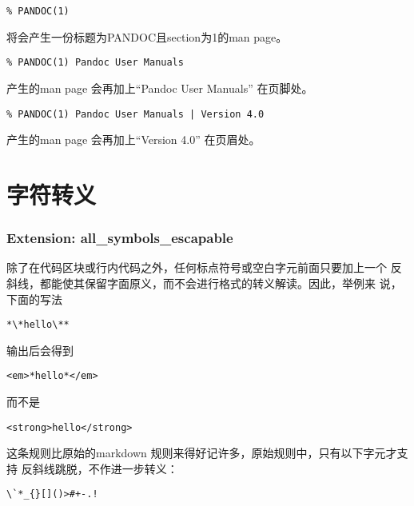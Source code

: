 \documentclass[cn]{elegantbook}
\begin{document}
\begin{lstlisting}
% PANDOC(1)
\end{lstlisting}

将会产生一份标题为PANDOC且section为1的man page。

\begin{lstlisting}
% PANDOC(1) Pandoc User Manuals
\end{lstlisting}

产生的man page 会再加上``Pandoc User Manuals'' 在页脚处。

\begin{lstlisting}
% PANDOC(1) Pandoc User Manuals | Version 4.0
\end{lstlisting}

产生的man page 会再加上``Version 4.0'' 在页眉处。

\hypertarget{ux5b57ux7b26ux8f6cux4e49}{%
\section{字符转义}\label{ux5b57ux7b26ux8f6cux4e49}}

\hypertarget{extension-all_symbols_escapable}{%
\subsubsection{Extension:
all\_symbols\_escapable}\label{extension-all_symbols_escapable}}

除了在代码区块或行内代码之外，任何标点符号或空白字元前面只要加上一个
反斜线，都能使其保留字面原义，而不会进行格式的转义解读。因此，举例来
说，下面的写法

\begin{lstlisting}
*\*hello\**
\end{lstlisting}

输出后会得到

\begin{lstlisting}
<em>*hello*</em>
\end{lstlisting}

而不是

\begin{lstlisting}
<strong>hello</strong>
\end{lstlisting}

这条规则比原始的markdown
规则来得好记许多，原始规则中，只有以下字元才支持
反斜线跳脱，不作进一步转义：

\begin{lstlisting}
\`*_{}[]()>#+-.!
\end{lstlisting}
\end{document}
